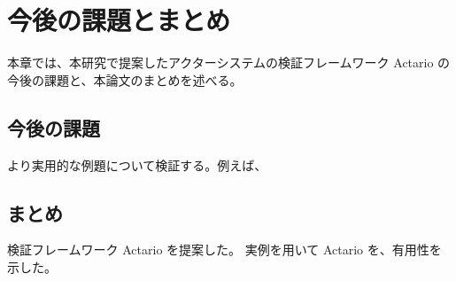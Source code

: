 \chapter{今後の課題とまとめ}

本章では、本研究で提案したアクターシステムの検証フレームワーク Actario の今後の課題と、本論文のまとめを述べる。

\section{今後の課題}

より実用的な例題について検証する。例えば、


\section{まとめ}

検証フレームワーク Actario を提案した。
実例を用いて Actario を、有用性を示した。
